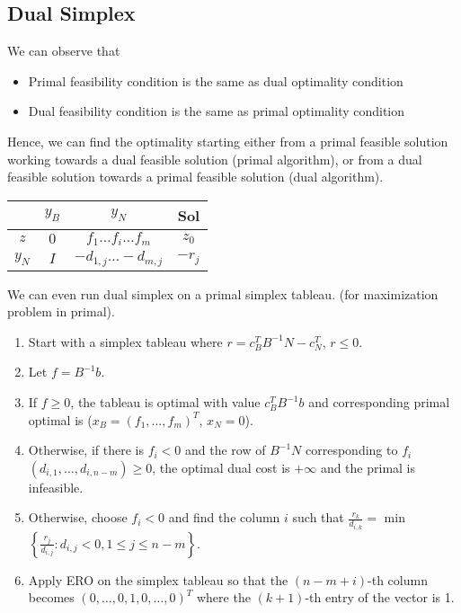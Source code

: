 \documentclass{article}
\theoremstyle{definition}
\begin{document}
    \subsection{Dual Simplex}
    We can observe that
    \begin{itemize}
        \item Primal feasibility condition is the same as dual optimality condition
        \item Dual feasibility condition is the same as primal optimality condition
    \end{itemize}
    Hence, we can find the optimality starting either from a primal feasible solution working towards a dual feasible solution (primal algorithm), or from a dual feasible solution towards a primal feasible solution (dual algorithm).\\
    
    \begin{center}
	\begin{tabular}{ | c | c | c | c | } 
		\hline
		& $y_B$ & $y_N$ & Sol \\
		\hline
		$z$ & $0$ & $f_1 \dots f_i \dots f_m$ & $z_0$ \\
		\hline
		$y_N$ & $I$ & $-d_{1,j} \dots -d_{m,j}$ & $-r_j$ \\
		\hline
	\end{tabular}
	\end{center}
	\hfill\break
    
    \noindent We can even run dual simplex on a primal simplex tableau. (for maximization problem in primal).
    
    \begin{enumerate}
			\item Start with a simplex tableau where $r = c_B^TB^{-1}N-c_N^T$, $r \leq 0$.
			\item Let $f = B^{-1}b$.
			\item If $f \geq 0$, the tableau is optimal with value $c_B^TB^{-1}b$ and corresponding primal optimal is ($x_B = (f_1, \dots, f_m)^T$, $x_N = 0$).
			\item Otherwise, if there is $f_i < 0$ and the row of $B^{-1}N$ corresponding to $f_i$ $(d_{i,1}, \dots, d_{i,n-m}) \geq 0$, the optimal dual cost is $+\infty$ and the primal is infeasible.
			\item Otherwise, choose $f_i < 0$ and find the column $i$ such that $\displaystyle \frac{r_k}{d_{i,k}} =$ min$\left\{\displaystyle \frac{r_j}{d_{i,j}}: d_{i,j}<0, 1\leq j \leq n-m\right\}$.
			\item Apply ERO on the simplex tableau so that the $(n-m+i)$-th column becomes $(0, \dots, 0, 1, 0, \dots, 0)^T$ where the $(k+1)$-th entry of the vector is 1.
		\end{enumerate}
	
\end{document}
